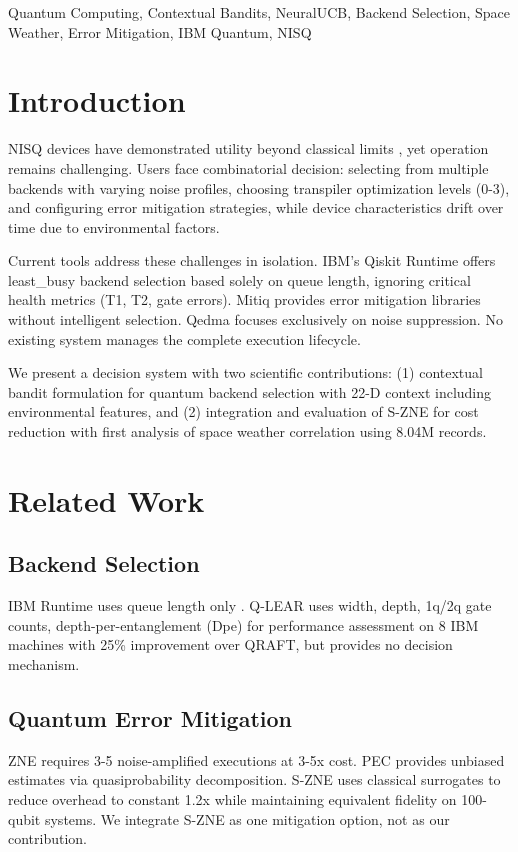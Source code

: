 \documentclass[conference]{IEEEtran}
\begin{document}
\begin{IEEEkeywords}
Quantum Computing, Contextual Bandits, NeuralUCB, Backend Selection, Space Weather, Error Mitigation, IBM Quantum, NISQ
\end{IEEEkeywords}

\section{Introduction}
NISQ devices have demonstrated utility beyond classical limits \cite{kim2023evidence}, yet operation remains challenging. Users face combinatorial decision: selecting from multiple backends with varying noise profiles, choosing transpiler optimization levels (0-3), and configuring error mitigation strategies, while device characteristics drift over time due to environmental factors.

Current tools address these challenges in isolation. IBM's Qiskit Runtime offers least\_busy backend selection based solely on queue length, ignoring critical health metrics (T1, T2, gate errors). Mitiq \cite{larose2022mitiq} provides error mitigation libraries without intelligent selection. Qedma focuses exclusively on noise suppression. No existing system manages the complete execution lifecycle.

We present a decision system with two scientific contributions: (1) contextual bandit formulation for quantum backend selection with 22-D context including environmental features, and (2) integration and evaluation of S-ZNE for cost reduction with first analysis of space weather correlation using 8.04M records.

\section{Related Work}
\subsection{Backend Selection}
IBM Runtime uses queue length only \cite{qiskit2024runtime}. Q-LEAR \cite{muqeet2024qlear} uses width, depth, 1q/2q gate counts, depth-per-entanglement (Dpe) for performance assessment on 8 IBM machines with 25\% improvement over QRAFT, but provides no decision mechanism.

\subsection{Quantum Error Mitigation}
ZNE \cite{temme2017error, kandala2019error} requires 3-5 noise-amplified executions at 3-5x cost. PEC \cite{endo2018practical, van2023probabilistic} provides unbiased estimates via quasiprobability decomposition. S-ZNE \cite{liao2024surrogate} uses classical surrogates to reduce overhead to constant 1.2x while maintaining equivalent fidelity on 100-qubit systems. We integrate S-ZNE as one mitigation option, not as our contribution.
\end{document}
